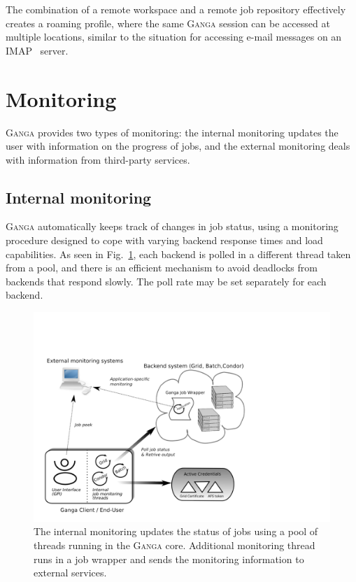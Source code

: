 \documentclass{elsart}
\def\ganga {\textsc{Ganga}\xspace}
\begin{document}
The combination of a remote workspace and a remote job repository effectively
creates a roaming profile, where the same \ganga session can be accessed at
multiple locations, similar to the situation for accessing e-mail messages
on an IMAP~\cite{IMAP} server.

\section{Monitoring}
\label{sec:mon}
\ganga provides two types of monitoring: the internal monitoring updates
the user with information on the progress of jobs, and the external
monitoring deals with information from third-party services.

\subsection{Internal monitoring}
\label{sec:GangaMonitoring}
\ganga automatically keeps track of changes in job status, using a
monitoring procedure designed to cope with
varying backend response times and load capabilities. As seen in
Fig.~\ref{fig:job_status_monitoring_mechanism}, each backend is polled in a
different thread taken from a pool, and there is an efficient mechanism
to avoid deadlocks from backends that respond slowly. The poll rate may be
set separately for each backend.
\begin{figure}[htbp]
  \begin{center}
    \includegraphics[width=1 \textwidth]{monitoring}
    \caption{The internal monitoring updates the status of jobs using a pool of threads running in the \ganga core. Additional monitoring thread runs in a job wrapper and sends the monitoring information to external services. }
    \label{fig:job_status_monitoring_mechanism}
  \end{center}
\end{figure}
\end{document}
